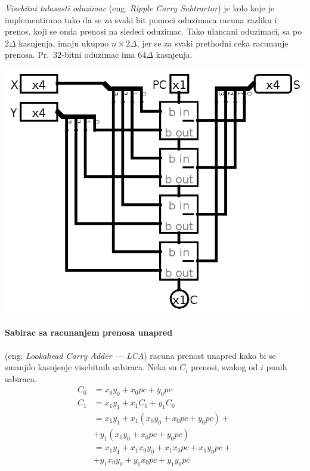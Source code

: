 \documentclass[12p,a4paper]{article}
\begin{document}
\begin{multicols}{2}
    \emph{Visebitni talasasti oduzimac} (eng. \emph{Ripple Carry Subtractor}) 
    je kolo koje je implementirano tako da se za svaki bit pomoci oduzimaca 
    racuna razliku i prenos, koji se onda prenosi na sledeci oduzimac. Tako 
    ulancani oduzimaci, sa po $2\Delta$ kasnjenja, imaju ukupno 
    $n \times 2\Delta$, jer se za svaki prethodni ceka racunanje prenosa. 
    Pr.\ 32-bitni oduzimac ima $64\Delta$ kasnjenja.

    \includegraphics[width=0.7\columnwidth]{Figures/riplle_carry_sub.png}

    \paragraph{Sabirac sa racunanjem prenosa unapred}
    (eng. \emph{Lookahead Carry Adder --- LCA}) racuna prenost unapred kako bi
    se smanjilo kasnjenje visebitnih sabiraca. Neka su $C_i$ prenosi, svakog 
    od $i$ punih sabiraca.
    \begin{align*}
        C_0 &= x_0 y_0 + x_0 pc + y_0 pc \\
        C_1 &= x_1 y_1 + x_1 C_0 + y_1 C_0 \\
            &= x_1 y_1 + x_1 (x_0 y_0 + x_0 pc + y_0 pc) + \\
            &+ y_1 (x_0 y_0 + x_0 pc + y_0 pc)\\
            &= x_1 y_1 + x_1 x_0 y_0 + x_1 x_0 pc + x_1 y_0 pc + \\
            &+ y_1 x_0 y_0 + y_1 x_0 pc + y_1 y_0 pc\\
    \end{align*}


\end{multicols}
\end{document}
